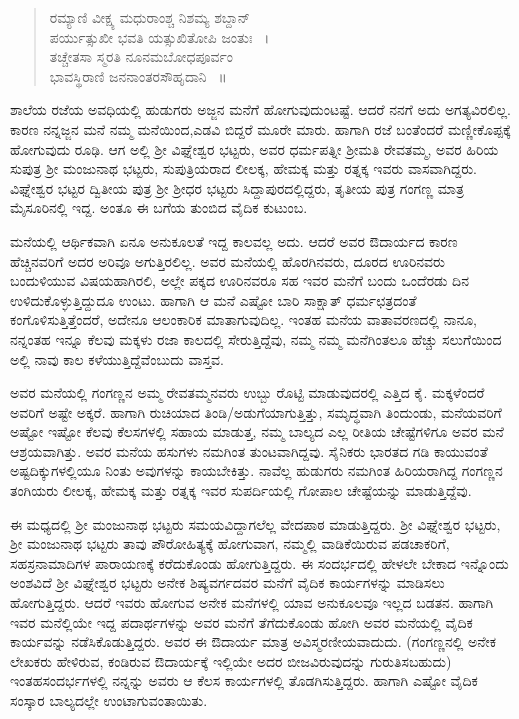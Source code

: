 {\begin{verse}
	ರಮ್ಯಾಣಿ ವೀಕ್ಷ್ಯ ಮಧುರಾಂಶ್ಚ ನಿಶಮ್ಯ ಶಬ್ದಾನ್ \\
	ಪರ್ಯುತ್ಸುಖೀ ಭವತಿ ಯತ್ಸುಖಿತೋಪಿ ಜಂತುಃ ~।\\
	ತಚ್ಚೇತಸಾ ಸ್ಮರತಿ ನೂನಮಬೋಧಪೂರ್ವಂ\\
	ಭಾವಸ್ಥಿರಾಣಿ ಜನನಾಂತರಸೌಹೃದಾನಿ ~॥
\end{verse}
	\smallskip
	ಶಾಲೆಯ ರಜೆಯ ಅವಧಿಯಲ್ಲಿ ಹುಡುಗರು ಅಜ್ಜನ ಮನೆಗೆ ಹೋಗುವುದುಂಟಷ್ಟೆ. ಆದರೆ ನನಗೆ ಅದು ಅಗತ್ಯವಿರಲಿಲ್ಲ. ಕಾರಣ ನನ್ನಜ್ಜನ ಮನೆ ನಮ್ಮ ಮನೆಯಿಂದ,\break ಎಡವಿ ಬಿದ್ದರೆ ಮೂರೇ ಮಾರು. ಹಾಗಾಗಿ ರಜೆ ಬಂತೆಂದರೆ ಮಣ್ಣೀಕೊಪ್ಪಕ್ಕೆ ಹೋಗುವುದು ರೂಢಿ. ಆಗ ಅಲ್ಲಿ  ಶ್ರೀ ವಿಘ್ನೇಶ್ವರ ಭಟ್ಟರು, ಅವರ ಧರ್ಮಪತ್ನೀ ಶ್ರೀಮತಿ ರೇವತಮ್ಮ, ಅವರ ಹಿರಿಯ ಸುಪುತ್ರ  ಶ್ರೀ ಮಂಜುನಾಥ ಭಟ್ಟರು, ಸುಪುತ್ರಿಯರಾದ ಲೀಲಕ್ಕ, ಹೇಮಕ್ಕ  ಮತ್ತು ರತ್ನಕ್ಕ ಇವರು ವಾಸವಾಗಿದ್ದರು.  ವಿಘ್ನೇಶ್ವರ ಭಟ್ಟರ ದ್ವಿತೀಯ ಪುತ್ರ  ಶ್ರೀ ಶ್ರೀಧರ ಭಟ್ಟರು ಸಿದ್ದಾಪುರದಲ್ಲಿದ್ದರು, ತೃತೀಯ ಪುತ್ರ ಗಂಗಣ್ಣ ಮಾತ್ರ ಮೈಸೂರಿನಲ್ಲಿ ಇದ್ದ. ಅಂತೂ ಈ ಬಗೆಯ ತುಂಬಿದ ವೈದಿಕ ಕುಟುಂಬ. 
	
	ಮನೆಯಲ್ಲಿ ಆರ್ಥಿಕವಾಗಿ ಏನೂ ಅನುಕೂಲತೆ ಇದ್ದ ಕಾಲವಲ್ಲ ಅದು. ಆದರೆ ಅವರ ಔದಾರ್ಯದ ಕಾರಣ ಹೆಚ್ಚಿನವರಿಗೆ ಅದರ ಅರಿವೂ ಅಗುತ್ತಿರಲಿಲ್ಲ. ಅವರ ಮನೆಯಲ್ಲಿ  ಹೊರಗಿನವರು,  ದೂರದ ಊರಿನವರು ಬಂದುಳಿಯುವ ವಿಷಯ\break  ಹಾಗಿರಲಿ, ಅಲ್ಲೇ ಪಕ್ಕದ ಊರಿನವರೂ  ಸಹ ಇವರ ಮನೆಗೆ ಬಂದು  ಒಂದೆರಡು ದಿನ ಉಳಿದುಕೊಳ್ಳುತ್ತಿದ್ದುದೂ ಉಂಟು. ಹಾಗಾಗಿ ಆ ಮನೆ  ಎಷ್ಟೋ ಬಾರಿ ಸಾಕ್ಷಾತ್ ಧರ್ಮಛತ್ರದಂತೆ ಕಂಗೊಳಿಸುತ್ತಿತ್ತೆಂದರೆ,  ಅದೇನೂ ಆಲಂಕಾರಿಕ ಮಾತಾಗುವುದಿಲ್ಲ. ಇಂತಹ  ಮನೆಯ ವಾತಾವರಣದಲ್ಲಿ ನಾನೂ, ನನ್ನಂತಹ ಇನ್ನೂ ಕೆಲವು ಮಕ್ಕಳು ರಜಾ ಕಾಲದಲ್ಲಿ  ಸೇರುತ್ತಿದ್ದೆವು, ನಮ್ಮ ನಮ್ಮ ಮನೆಗಿಂತಲೂ ಹೆಚ್ಚು ಸಲುಗೆಯಿಂದ ಅಲ್ಲಿ ನಾವು ಕಾಲ ಕಳೆಯುತ್ತಿದ್ದೆವೆಂಬುದು ವಾಸ್ತವ.
	 
ಅವರ ಮನೆಯಲ್ಲಿ ಗಂಗಣ್ಣನ ಅಮ್ಮ \enginline{-} ರೇವತಮ್ಮನವರು ಉಬ್ಬು ರೊಟ್ಟಿ ಮಾಡುವುದರಲ್ಲಿ ಎತ್ತಿದ ಕೈ. ಮಕ್ಕಳೆಂದರೆ ಅವರಿಗೆ ಅಷ್ಟೇ ಅಕ್ಕರೆ. ಹಾಗಾಗಿ ರುಚಿಯಾದ ತಿಂಡಿ/ಅಡುಗೆಯಾಗುತ್ತಿತ್ತು, ಸಮೃದ್ಧವಾಗಿ ತಿಂದುಂಡು, ಮನೆಯವರಿಗೆ  ಅಷ್ಟೋ ಇಷ್ಟೋ ಕೆಲವು ಕೆಲಸಗಳಲ್ಲಿ ಸಹಾಯ ಮಾಡುತ್ತ, ನಮ್ಮ ಬಾಲ್ಯದ ಎಲ್ಲ ರೀತಿಯ ಚೇಷ್ಟೆಗಳಿಗೂ ಅವರ ಮನೆ ಆಶ್ರಯವಾಗಿತ್ತು. 
ಅವರ  ಮನೆಯ ಹಸುಗಳು ನಮಗಿಂತ ತುಂಟವಾಗಿದ್ದವು. ಸೈನಿಕರು ಭಾರತದ ಗಡಿ ಕಾಯುವಂತೆ ಅಷ್ಟದಿಕ್ಕುಗಳಲ್ಲಿಯೂ ನಿಂತು ಅವುಗಳನ್ನು  ಕಾಯಬೇಕಿತ್ತು. ನಾವೆಲ್ಲ ಹುಡುಗರು ನಮಗಿಂತ ಹಿರಿಯರಾಗಿದ್ದ ಗಂಗಣ್ಣನ ತಂಗಿಯರು \enginline{-} ಲೀಲಕ್ಕ, ಹೇಮಕ್ಕ ಮತ್ತು ರತ್ನಕ್ಕ \enginline{-} ಇವರ ಸುಪರ್ದಿಯಲ್ಲಿ ಗೋಪಾಲ ಚೇಷ್ಟೆಯನ್ನು ಮಾಡುತ್ತಿದ್ದೆವು. 

ಈ ಮಧ್ಯದಲ್ಲಿ  ಶ್ರೀ ಮಂಜುನಾಥ ಭಟ್ಟರು ಸಮಯವಿದ್ದಾಗಲೆಲ್ಲ ವೇದಪಾಠ ಮಾಡುತ್ತಿದ್ದರು. ಶ್ರೀ ವಿಘ್ನೇಶ್ವರ ಭಟ್ಟರು, ಶ್ರೀ ಮಂಜುನಾಥ ಭಟ್ಟರು ತಾವು ಪೌರೋಹಿತ್ಯಕ್ಕೆ ಹೋಗುವಾಗ, ನಮ್ಮಲ್ಲಿ ವಾಡಿಕೆಯಿರುವ ಪಡಚಾಕರಿಗೆ,  ಸಹಸ್ರನಾಮಾದಿಗಳ ಪಾರಾಯಣಕ್ಕೆ  ಕರೆದುಕೊಂಡು ಹೋಗುತ್ತಿದ್ದರು. ಈ ಸಂದರ್ಭದಲ್ಲಿ ಹೇಳಲೇ ಬೇಕಾದ ಇನ್ನೊಂದು ಅಂಶವಿದೆ \enginline{-} ಶ್ರೀ ವಿಘ್ನೇಶ್ವರ ಭಟ್ಟರು ಅನೇಕ ಶಿಷ್ಯವರ್ಗದವರ ಮನೆಗೆ ವೈದಿಕ ಕಾರ್ಯಗಳನ್ನು ಮಾಡಿಸಲು ಹೋಗುತ್ತಿದ್ದರು. ಆದರೆ ಇವರು ಹೋಗುವ ಅನೇಕ ಮನೆಗಳಲ್ಲಿ ಯಾವ ಅನುಕೂಲವೂ  ಇಲ್ಲದ ಬಡತನ. ಹಾಗಾಗಿ ಇವರ ಮನೆಲ್ಲಿಯೇ ಇದ್ದ ಪದಾರ್ಥಗಳನ್ನು  ಅವರ ಮನೆಗೆ  ತೆಗೆದುಕೊಂಡು ಹೋಗಿ ಅವರ ಮನೆಯಲ್ಲಿ ವೈದಿಕ ಕಾರ್ಯವನ್ನು ನಡೆಸಿಕೊಡುತ್ತಿದ್ದರು. ಅವರ ಈ ಔದಾರ್ಯ ಮಾತ್ರ \break ಅವಿಸ್ಮರಣೀಯವಾದುದು. (ಗಂಗಣ್ಣನಲ್ಲಿ ಅನೇಕ ಲೇಖಕರು ಹೇಳಿರುವ, ಕಂಡಿರುವ ಔದಾರ್ಯಕ್ಕೆ ಇಲ್ಲಿಯೇ ಅದರ ಬೀಜವಿರುವುದನ್ನು  ಗುರುತಿಸಬಹುದು) ಇಂತಹ\break ಸಂದರ್ಭಗಳಲ್ಲಿ  ನನ್ನನ್ನು ಅವರು ಆ ಕೆಲಸ ಕಾರ್ಯಗಳಲ್ಲಿ ತೊಡಗಿಸುತ್ತಿದ್ದರು. ಹಾಗಾಗಿ ಎಷ್ಟೋ ವೈದಿಕ ಸಂಸ್ಕಾರ ಬಾಲ್ಯದಲ್ಲೇ ಉಂಟಾಗುವಂತಾಯಿತು.  

}
